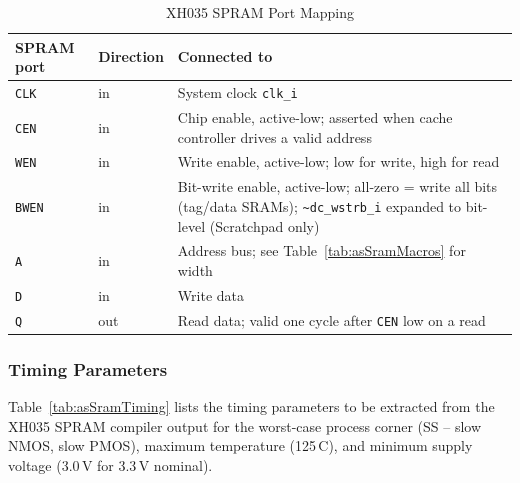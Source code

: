 \begin{table}[H]
\caption{XH035 SPRAM Port Mapping}
\label{tab:asSramPorts}
\centering
\begin{tabularx}{\textwidth}{|l |l |X|}
  \hline
  SPRAM port & Direction & Connected to \\
  \hline
  \hline
  \texttt{CLK}  & in  & System clock \texttt{clk\_i} \\
  \hline
  \texttt{CEN}  & in  & Chip enable, active-low; asserted when cache controller
                        drives a valid address \\
  \hline
  \texttt{WEN}  & in  & Write enable, active-low; low for write, high for read \\
  \hline
  \texttt{BWEN} & in  & Bit-write enable, active-low; all-zero = write all bits
                        (tag/data SRAMs); \texttt{\textasciitilde dc\_wstrb\_i}
                        expanded to bit-level (Scratchpad only) \\
  \hline
  \texttt{A}    & in  & Address bus; see Table~\ref{tab:asSramMacros} for width \\
  \hline
  \texttt{D}    & in  & Write data \\
  \hline
  \texttt{Q}    & out & Read data; valid one cycle after \texttt{CEN} low on a read \\
  \hline
\end{tabularx}
\end{table}

\subsubsection{Timing Parameters}

Table~\ref{tab:asSramTiming} lists the timing parameters to be extracted
from the XH035 SPRAM compiler output for the worst-case process corner
(SS -- slow NMOS, slow PMOS), maximum temperature (125\,\textdegree C),
and minimum supply voltage (3.0\,V for 3.3\,V nominal).

